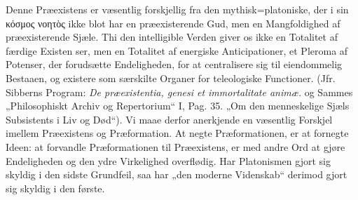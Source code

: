 \documentclass[12pt]{book}
\newcommand{\opage}[1]{\marginnote{\footnotesize\textit{[#1]}}}
\begin{document}
Denne Præexistens er væsentlig forskjellig fra den mythisk=platoniske, der i sin κόσμος
νοητὸς ikke blot har en præexisterende Gud, men en Mangfoldighed af præexisterende Sjæle.
Thi den intelligible Verden giver os ikke en Totalitet af færdige Existen%
\opage{256}%
ser, men en Totalitet af energiske Anticipationer, et Pleroma af Potenser, der forudsætte
Endeligheden, for at centralisere sig til eiendommelig Bestaaen, og existere som
særskilte Organer for teleologiske Functioner. (Jfr. Sibberns Program:
\textit{De præexistentia, genesi et immortalitate animæ.} og Sammes „Philosophiskt Archiv
og Repertorium“ I, Pag. 35. „Om den menneskelige Sjæls Subsistents i Liv og Død“). Vi
maae derfor anerkjende en væsentlig Forskjel imellem Præexistens og Præformation. At
negte Præformationen, er at fornegte Ideen: at forvandle Præformationen til Præexistens,
er med andre Ord at gjøre Endeligheden og den ydre Virkelighed overflødig. Har
Platonismen gjort sig skyldig i den sidste Grundfeil, saa har „den moderne Videnskab“
derimod gjort sig skyldig i den første.
\end{document}
